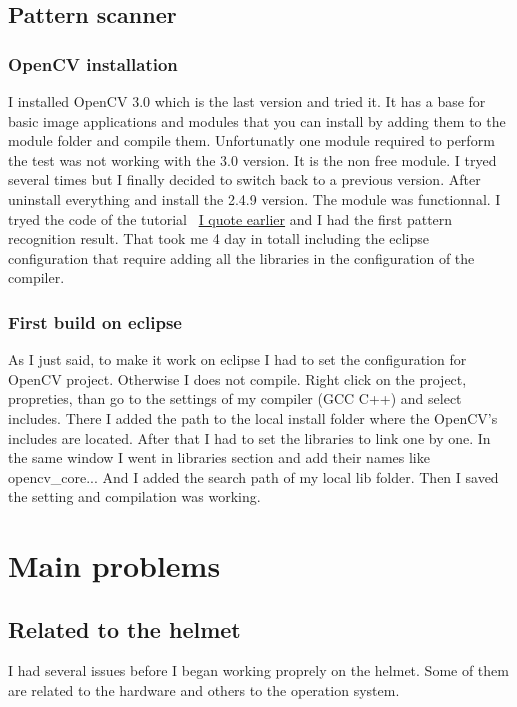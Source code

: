 	\subsection{Pattern scanner}
	\subsubsection{OpenCV installation}

	\par I installed OpenCV 3.0 which is the last version and tried it. It has a base for basic image applications and modules that you can install by adding them to the module folder and compile them. Unfortunatly one module required to perform the test was not working with the 3.0 version. It is the non free module. I tryed several times but I finally decided to switch back to a previous version. After uninstall everything and install the 2.4.9 version. The module was functionnal. I tryed the code of the tutorial ~\hyperlink{opencv}{I quote earlier} and I had the first pattern recognition result. That took me 4 day in totall including the eclipse configuration that require adding all the libraries in the configuration of the compiler.
	
	\subsubsection{First build on eclipse}	
	
	\par As I just said, to make it work on eclipse I had to set the configuration for OpenCV project. Otherwise I does not compile. Right click on the project, propreties, than	go to the settings of my compiler (GCC  C++) and select includes. There I added the path to the local install folder where the OpenCV's includes are located. After that I had to set the libraries to link one by one. In the same window I went in libraries section and add their names like opencv\_core... And I added the search path of my local lib folder. Then I saved the setting and compilation was working.
	
	
	\section{Main problems}	
	\subsection{Related to the helmet}
	\par I had several issues before I began working proprely on the helmet. Some of them are related to the hardware and others to the operation system.
